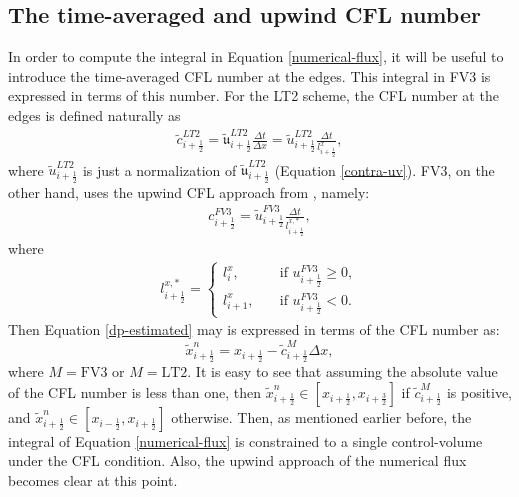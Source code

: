 \documentclass[preprint,12pt]{elsarticle}
\begin{document}
\begin{linenumbers}
\subsection{The time-averaged and upwind CFL number}
\label{timeav-cfl}
In order to compute the integral in Equation \eqref{numerical-flux}, it will be useful to introduce the time-averaged CFL number at the edges.
This integral in FV3 is expressed in terms of this number.
For the LT2 scheme, the CFL number at the edges is defined naturally as
\begin{align}
	\label{cfl_LT2}
	\tilde{c}_{i+\frac{1}{2}}^{LT2} = {\mathfrak{\tilde{u}}}_{i+\frac{1}{2}}^{LT2}\frac{\Delta t}{\Delta x}
	= {\tilde{u}}_{i+\frac{1}{2}}^{LT2}\frac{\Delta t}
	{{l^x_{i+\frac{1}{2}}}},
\end{align}
where ${\tilde{u}}_{i+\frac{1}{2}}^{LT2}$ is just a normalization of 
${\mathfrak{\tilde{u}}}_{i+\frac{1}{2}}^{LT2}$ (Equation \eqref{contra-uv}).
 FV3, on the other hand, uses the upwind CFL approach from \cite{lin:1994}, namely:
\begin{align}
	\label{cfl_fv3}
	{c}_{i+\frac{1}{2}}^{FV3}
    ={\tilde{u}}_{i+\frac{1}{2}}^{FV3}\frac{{\Delta t}}
	{{{l^{x,*}_{i+\frac{1}{2}}}}},
\end{align}
where
\begin{align}
	\label{cfl_dp1-dx}
    {{l^{x,*}_{i+\frac{1}{2}}}} = 
	\begin{cases}
		{{l^{x}_{i}}},
		\quad &\text{if }{{{u}}_{i+\frac{1}{2}}^{FV3} \ge 0},\\
		{{l^{x}_{i+1}}}, 
		\quad &\text{if }{{{u}}_{i+\frac{1}{2}}^{FV3} < 0}.
	\end{cases}
\end{align}
Then Equation \eqref{dp-estimated} may is expressed in terms of the CFL number as:
\begin{equation}
	\label{dp-estimated-cfl}
	\tilde{x}_{i+\frac{1}{2}}^n = x_{i+\frac{1}{2}} - {\tilde{c}}^{M}_{i+\frac{1}{2}}\Delta x,
\end{equation}
where $M=\text{FV3}$ or $M=\text{LT2}$. 
It is easy to see that assuming the absolute value of the CFL number is less than one, then $\tilde{x}_{i+\frac{1}{2}}^n \in [{x}_{i+\frac{1}{2}},{x}_{i+\frac{3}{2}}]$ if ${\tilde{c}}^{M}_{i+\frac{1}{2}}$ is positive, and $\tilde{x}_{i+\frac{1}{2}}^n \in [{x}_{i-\frac{1}{2}},{x}_{i+\frac{1}{2}}]$ otherwise.
Then, as mentioned earlier before, the integral of Equation \eqref{numerical-flux} is constrained to a single control-volume under the CFL condition.
Also, the upwind approach of the numerical flux becomes clear at this point.


\end{linenumbers}
\end{document}
